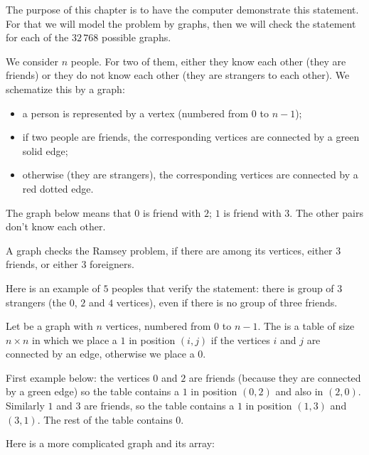 \documentclass[11pt,class=report,crop=false]{standalone}
\begin{document}
\begin{cours}


The purpose of this chapter is to have the computer demonstrate this statement. For that we will model the problem by graphs, then we will check the statement for each of the $32\,768$ possible graphs.

\bigskip 

We consider $n$ people. For two of them, either they know each other (they are friends) or they do not know each other (they are strangers to each other). We schematize this by a graph:
\begin{itemize}
  \item a person is represented by a vertex (numbered from $0$ to $n-1$);
  \item if two people are friends, the corresponding vertices are connected by a green solid edge;
  \item otherwise (they are strangers), the corresponding vertices are connected by a red dotted edge. 
\end{itemize}

The graph below means that $0$ is friend with $2$; $1$ is friend with $3$. The other pairs don't know each other.

A graph checks the Ramsey problem, if there are among its vertices, either $3$ friends, or either $3$ foreigners.

Here is an example of $5$ peoples that verify the statement: there is group of $3$ strangers (the $0$, $2$ and $4$ vertices), even if there is no group of three friends.

\end{cours}


\begin{cours}[Model]



Let be a graph with $n$ vertices, numbered from $0$ to $n-1$.
The  is a table of size $n \times n$ in which we place a $1$ in position $(i,j)$ if the vertices $i$ and $j$ are connected by an edge, otherwise we place a $0$.

\bigskip
First example below: the vertices $0$ and $2$ are friends (because they are connected by a green edge) so the table contains a $1$ in position $(0,2)$ and also in $(2,0)$. Similarly $1$ and $3$ are friends, so the table contains a $1$ in position $(1,3)$ and $(3,1)$. The rest of the table contains $0$.


Here is a more complicated graph and its array:

\end{cours}
\end{document}
